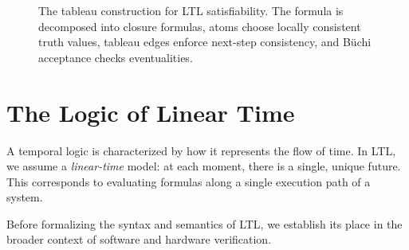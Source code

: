 \begin{figure}[ht]
  \centering
  \caption{The tableau construction for LTL satisfiability.  The formula is
           decomposed into closure formulas, atoms choose locally consistent
           truth values, tableau edges enforce next-step consistency, and
           B\"uchi acceptance checks eventualities.}
  \label{fig:ltl-tableau-roadmap}
\end{figure}

\section{The Logic of Linear Time}
\label{sec:ltl-motivation}

A temporal logic is characterized by how it represents the flow of time. In LTL, we assume a \emph{linear-time} model: at each moment, there is a single, unique future. This corresponds to evaluating formulas along a single execution path of a system.

Before formalizing the syntax and semantics of LTL, we establish its place in the broader context of software and hardware verification.

